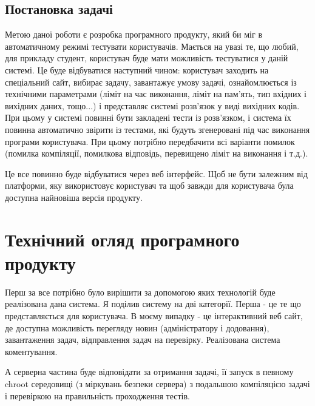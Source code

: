 \subsection{Постановка задачі}
Метою даної роботи є розробка програмного продукту, який би міг в автоматичному режимі тестувати користувачів. Мається на увазі те, що любий, для прикладу студент, користувач буде мати можливість тестуватися у даній системі. Це буде відбуватися наступний чином: користувач заходить на спеціальний сайт, вибирає задачу, завантажує умову задачі, ознайомлюється із технічними параметрами (ліміт на час виконання, ліміт на пам'ять, тип вхідних і вихідних даних, тощо...) і представляє системі розв'язок у виді вихідних кодів. При цьому у системі повинні бути закладені тести із розв'язком, і система їх повинна автоматично звірити із тестами, які будуть згенеровані під час виконання програми користувача. При цьому потрібно передбачити всі варіанти помилок (помилка компіляції, помилкова відповідь, перевищено ліміт на виконання і т.д.). 
\par Це все повинно буде відбуватися через веб інтерфейс. Щоб не бути залежним від платформи, яку використовує користувач та щоб завжди для користувача була доступна найновіша версія продукту.



\section{Технічний огляд програмного продукту}
Перш за все потрібно було вирішити за допомогою яких технологій буде реалізована дана система. Я поділив систему на дві категорії. Перша - це те що представляється для користувача. В моєму випадку - це інтерактивний веб сайт, де доступна можливість перегляду новин (адміністратору і додовання), завантаження задач, відправлення задач на перевірку. Реалізована система коментування.
\par А серверна частина буде відповідати за отримання задачі, її запуск в певному chroot середовищі (з міркувань безпеки сервера) з подальшою компіляцією задачі і перевіркою на правильність проходження тестів.


